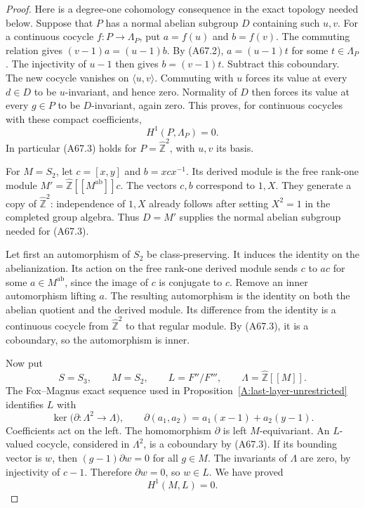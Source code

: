 \begin{proof}
Here is a degree-one cohomology consequence
in the exact topology needed below.
Suppose that $P$ has a normal abelian subgroup
$D$ containing such $u,v$.
For a continuous cocycle
$f:P\to\Lambda_P$, put $a=f(u)$ and $b=f(v)$.
The commuting relation gives
$(v-1)a=(u-1)b$.
By (A67.2), $a=(u-1)t$ for some
$t\in\Lambda_P$. The injectivity of $u-1$
then gives $b=(v-1)t$.
Subtract this coboundary. The new cocycle
vanishes on $\langle u,v\rangle$.
Commuting with $u$ forces its value at every
$d\in D$ to be $u$-invariant, and hence zero.
Normality of $D$ then forces its value at
every $g\in P$ to be $D$-invariant, again zero.
This proves, for continuous cocycles with
these compact coefficients,
\[
                  H^1(P,\Lambda_P)=0.                 \tag{A67.3}
\]
In particular (A67.3) holds for
$P=\widehat{\mathbb Z}^2$, with $u,v$ its
basis.

For $M=S_2$, let
$c=[x,y]$ and $b=xcx^{-1}$.
Its derived module is the free rank-one
module
$M'=\widehat{\mathbb Z}[[M^{\mathrm{ab}}]]c$.
The vectors $c,b$ correspond to $1,X$.
They generate a copy of
$\widehat{\mathbb Z}^2$: independence of
$1,X$ already follows after setting
$X^2=1$ in the completed group algebra.
Thus $D=M'$ supplies the normal abelian
subgroup needed for (A67.3).

Let first an automorphism of $S_2$ be
class-preserving. It induces the identity on
the abelianization. Its action on the free
rank-one derived module sends $c$ to $a c$
for some $a\in M^{\mathrm{ab}}$, since the
image of $c$ is conjugate to $c$.
Remove an inner automorphism lifting $a$.
The resulting automorphism is the identity
on both the abelian quotient and the derived
module. Its difference from the identity
is a continuous cocycle from
$\widehat{\mathbb Z}^2$ to that regular
module. By (A67.3), it is a coboundary, so
the automorphism is inner.

Now put
\[
 S=S_3,\qquad M=S_2,\qquad
 L=F''/F''',\qquad
 \Lambda=\widehat{\mathbb Z}[[M]].
\]
The Fox--Magnus exact sequence used in
Proposition~\ref{A:last-layer-unrestricted}
identifies $L$ with
\[
 \ker\bigl(\partial:\Lambda^2\to\Lambda\bigr),
 \qquad
       \partial(a_1,a_2)=a_1(x-1)+a_2(y-1).
                                                        \tag{A67.4}
\]
Coefficients act on the left. The homomorphism
$\partial$ is left $M$-equivariant.
An $L$-valued cocycle, considered in
$\Lambda^2$, is a coboundary by (A67.3).
If its bounding vector is $w$, then
$(g-1)\partial w=0$ for all $g\in M$.
The invariants of $\Lambda$ are zero, by
injectivity of $c-1$. Therefore $\partial w=0$,
so $w\in L$. We have proved
\[
                         H^1(M,L)=0.                 \tag{A67.5}
\]


\end{proof}
